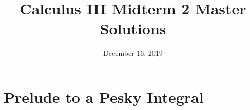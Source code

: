 \documentclass{article}
\title{Calculus III Midterm 2 Master Solutions}
\author{}
\date{December 16, 2019}
\begin{document}
\maketitle

\section{Prelude to a Pesky Integral}
\end{document}
